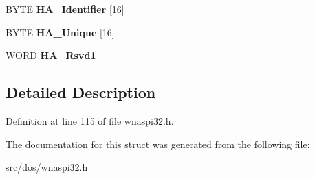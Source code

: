 \begin{DoxyCompactItemize}
\item 
\hypertarget{structSRB__HAInquiry_a62ede40526f2f54f23bbc297a3220383}{B\-Y\-T\-E {\bfseries H\-A\-\_\-\-Identifier} \mbox{[}16\mbox{]}}\label{structSRB__HAInquiry_a62ede40526f2f54f23bbc297a3220383}

\item 
\hypertarget{structSRB__HAInquiry_aedfe956eb5b7dd48e0c433c5e7cc138b}{B\-Y\-T\-E {\bfseries H\-A\-\_\-\-Unique} \mbox{[}16\mbox{]}}\label{structSRB__HAInquiry_aedfe956eb5b7dd48e0c433c5e7cc138b}

\item 
\hypertarget{structSRB__HAInquiry_a0e9f05a4de45c86d8aaad845499b531e}{W\-O\-R\-D {\bfseries H\-A\-\_\-\-Rsvd1}}\label{structSRB__HAInquiry_a0e9f05a4de45c86d8aaad845499b531e}

\end{DoxyCompactItemize}


\subsection{Detailed Description}


Definition at line 115 of file wnaspi32.\-h.



The documentation for this struct was generated from the following file\-:\begin{DoxyCompactItemize}
\item 
src/dos/wnaspi32.\-h\end{DoxyCompactItemize}
